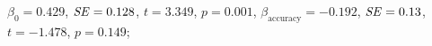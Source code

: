 $\beta_0=0.429$, $\mathit{SE}=0.128$, $t=3.349$, $p=0.001$, $\beta_{\textrm{accuracy}} =-0.192$, $\mathit{SE}=0.13$, $t=-1.478$, $p=0.149$;